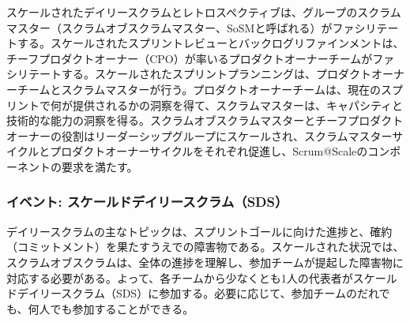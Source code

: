 \documentclass[12pt,a4paper,parskip=full]{scrartcl}
\begin{document}

スケールされたデイリースクラムとレトロスペクティブは、グループのスクラムマスター（スクラムオブスクラムマスター、SoSMと呼ばれる）がファシリテートする。スケールされたスプリントレビューとバックログリファインメントは、チーフプロダクトオーナー（CPO）が率いるプロダクトオーナーチームがファシリテートする。スケールされたスプリントプランニングは、プロダクトオーナーチームとスクラムマスターが行う。プロダクトオーナーチームは、現在のスプリントで何が提供されるかの洞察を得て、スクラムマスターは、キャパシティと技術的な能力の洞察を得る。スクラムオブスクラムマスターとチーフプロダクトオーナーの役割はリーダーシップグループにスケールされ、スクラムマスターサイクルとプロダクトオーナーサイクルをそれぞれ促進し、Scrum@Scaleのコンポーネントの要求を満たす。

\subsubsection{イベント: スケールドデイリースクラム（SDS）}\label{event-the-scaled-daily-scrum}

デイリースクラムの主なトピックは、スプリントゴールに向けた進捗と、確約（コミットメント）を果たすうえでの障害物である。スケールされた状況では、スクラムオブスクラムは、全体の進捗を理解し、参加チームが提起した障害物に対応する必要がある。よって、各チームから少なくとも1人の代表者がスケールドデイリースクラム（SDS）に参加する。必要に応じて、参加チームのだれでも、何人でも参加することができる。
\end{document}
